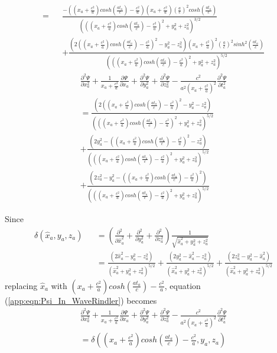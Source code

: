 \documentclass[prd,showpacs,preprint]{revtex4-1}
\begin{document}
\begin{appendix}
\begin{eqnarray}
=&&\frac{-((x_a+\frac{c^2}{a})cosh(\frac{at_a}{c})-\frac{c^2}{a})(x_a+\frac{c^2}{a})(\frac{a}{c})^2cosh(\frac{at_a}{c})}{(((x_a+\frac{c^2}{a})cosh(\frac{at_a}{c})-\frac{c^2}{a})^2+y_a^2+z_a^2)^{3/2}}\nonumber\\
&&+\frac{(2((x_a+\frac{c^2}{a})cosh(\frac{at_a}{c})-\frac{c^2}{a})^2-y_a^2-z_a^2)(x_a+\frac{c^2}{a})^2(\frac{a}{c})^2sinh^2(\frac{at_a}{c})}{(((x_a+\frac{c^2}{a})cosh(\frac{at_a}{c})-\frac{c^2}{a})^2+y_a^2+z_a^2)^{5/2}}
\end{eqnarray}
\begin{eqnarray}
\frac{\partial^2 \Psi}{\partial x_a^2} + \frac{1}{x_a+\frac{c^2}{a}}\frac{\partial \Psi}{\partial x_a} + \frac{\partial^2 \Psi}{\partial y_a^2} + \frac{\partial^2 \Psi}{\partial z_a^2} - \frac{c^2}{a^2(x_a+\frac{c^2}{a})^2}\frac{\partial^2 \Psi}{\partial t_a^2}\nonumber\\
=\frac{(2((x_a+\frac{c^2}{a})cosh(\frac{at_a}{c})-\frac{c^2}{a})^2-y_a^2-z_a^2)}{(((x_a+\frac{c^2}{a})cosh(\frac{at_a}{c})-\frac{c^2}{a})^2+y_a^2+z_a^2)^{5/2}}\nonumber\\
+\frac{(2y_a^2-((x_a+\frac{c^2}{a})cosh(\frac{at_a}{c})-\frac{c^2}{a})^2-z_a^2)}{(((x_a+\frac{c^2}{a})cosh(\frac{at_a}{c})-\frac{c^2}{a})^2+y_a^2+z_a^2)^{5/2}}\nonumber\\
+\frac{(2z_a^2-y_a^2-((x_a+\frac{c^2}{a})cosh(\frac{at_a}{c})-\frac{c^2}{a})^2)}{(((x_a+\frac{c^2}{a})cosh(\frac{at_a}{c})-\frac{c^2}{a})^2+y_a^2+z_a^2)^{5/2}}
\label{app:eqn:Psi_In_WaveRindler}
\end{eqnarray}

Since
\begin{eqnarray}
\delta(\hat{x}_a,y_a,z_a)&&=(\frac{\partial^2}{\partial \hat{x}_a^2} + \frac{\partial^2}{\partial y_a^2} + \frac{\partial^2}{\partial z_a^2})\frac{1}{\sqrt{\hat{x}_a^2+y_a^2+z_a^2}}\nonumber\\
&&=\frac{(2\hat{x}_a^2-y_a^2-z_a^2)}{(\hat{x}_a^2+y_a^2+z_a^2)^{5/2}} + \frac{(2y_a^2-\hat{x}_a^2-z_a^2)}{(\hat{x}_a^2+y_a^2+z_a^2)^{5/2}}
+\frac{(2z_a^2-y_a^2-\hat{x}_a^2)}{(\hat{x}_a^2+y_a^2+z_a^2)^{5/2}}
\end{eqnarray}
replacing $\hat{x}_a$ with $(x_a+\frac{c^2}{a})cosh(\frac{at_a}{c})-\frac{c^2}{a}$, equation (\ref{app:eqn:Psi_In_WaveRindler}) becomes
\begin{eqnarray}
\frac{\partial^2 \Psi}{\partial x_a^2} + \frac{1}{x_a+\frac{c^2}{a}}\frac{\partial \Psi}{\partial x_a} + \frac{\partial^2 \Psi}{\partial y_a^2} + \frac{\partial^2 \Psi}{\partial z_a^2} - \frac{c^2}{a^2(x_a+\frac{c^2}{a})^2}\frac{\partial^2 \Psi}{\partial t_a^2}\nonumber\\
=\delta((x_a+\frac{c^2}{a})cosh(\frac{at_a}{c})-\frac{c^2}{a},y_a,z_a)
\label{app:eqn:WaveRindler_Free_Fall}
\end{eqnarray}


\end{appendix}
\end{document}
